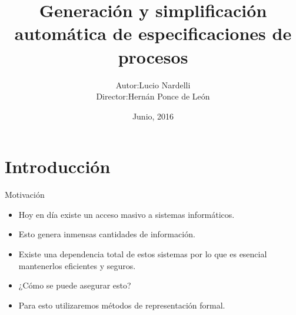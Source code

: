 \documentclass[spanish,pdf]{beamer}
\begin{document}
  
\title[Generación y simplificación de especificaciones de procesos]{Generación y simplificación automática de especificaciones de procesos}
\author[Lucio Nardelli]{\begin{tabular}{r@{ }l} 
  Autor:      & Lucio Nardelli \\[1ex]
  Director:   & Hernán Ponce de León\\
  \end{tabular}}
\date{Junio, 2016}
  
\begin{frame}
  \titlepage
\end{frame}
  
  
\section{Introducción}
  
\begin{frame}{Motivación}{}
    \begin{itemize}
      \setlength\itemsep{0.4cm}
      \item<2-> Hoy en día existe un acceso masivo a sistemas informáticos.
      \item<3-> Esto genera inmensas cantidades de información.
      \item<4-> Existe una dependencia total de estos sistemas por lo que es
                esencial mantenerlos eficientes y seguros.
      \item<5-> ¿Cómo se puede asegurar esto?
      \item<6-> Para esto utilizaremos métodos de representación formal.
    \end{itemize}
\end{frame}
\end{document}
